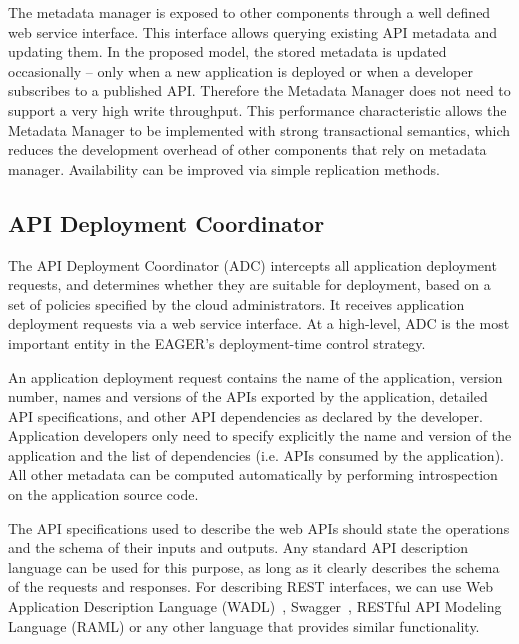 The metadata manager is exposed to other components through a well defined web service interface.
This interface allows querying existing API metadata and updating them. In the proposed model, the stored metadata is updated 
occasionally -- only when a new application is deployed or when a developer subscribes to a published API. 
Therefore the Metadata Manager
does not need to support a very high write throughput. This performance
characteristic allows the Metadata Manager to be implemented with strong 
transactional semantics,
which reduces the development overhead of other components that rely on metadata manager. 
Availability can be improved via simple replication methods.

\subsection{API Deployment Coordinator} 
\label{sec:adc}
The API Deployment Coordinator (ADC)
intercepts all application deployment requests, and determines whether they are
suitable for deployment, based on a set of policies specified by the cloud
administrators. It receives application deployment requests via a web service
interface. At a high-level, ADC is the most important entity in the EAGER's deployment-time
control strategy.

An application deployment request contains the name of the application,
version number, names and versions of the APIs exported by the application,
detailed API specifications, and other API dependencies as declared by the
developer. Application developers only need to specify explicitly the name and
version of the application and the list of dependencies (i.e. APIs consumed by
the application). All other metadata can be computed automatically by
performing introspection on the application source code. 

The API specifications used to describe the web APIs should state the
operations and the schema of their inputs and outputs.  Any standard API
description language can be used for this purpose, as long as it clearly
describes the schema of the requests and responses. For describing REST
interfaces, we can use Web Application Description Language (WADL)~\cite{hl:wadl}, Swagger~\cite{hl:swagger},
RESTful API Modeling Language (RAML) or any other language that provides similar functionality. %

